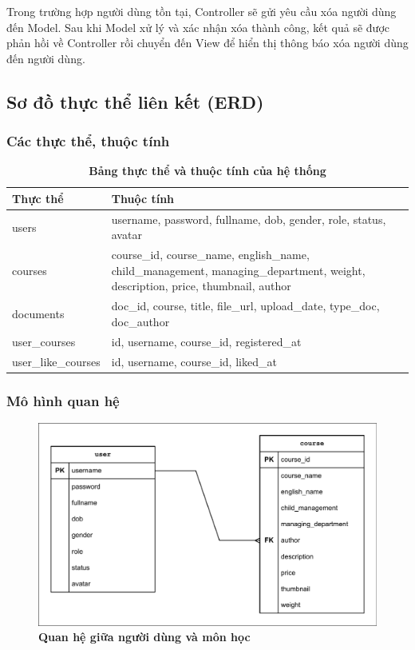 \documentclass{article}
\begin{document}
	 Trong trường hợp người dùng tồn tại, Controller sẽ gửi yêu cầu xóa người dùng đến Model. Sau khi Model xử lý và xác nhận xóa thành công, kết quả sẽ được phản hồi về Controller rồi chuyển đến View để hiển thị thông báo xóa người dùng đến người dùng.
	 
	 \subsection{Sơ đồ thực thể liên kết (ERD)}
	 \subsubsection{Các thực thể, thuộc tính}
	 
	 \begin{table}[H]
	 	\centering
	 	\caption [Bảng thực thể và thuộc tính của hệ thống]{\bfseries \fontsize{12pt}{0pt}\selectfont Bảng thực thể và thuộc tính của hệ thống}
	 	\label{tab311}
	 	\begin{tabular}{|p{6cm}|p{8.5cm}|}
	 		\hline
	 		\textbf{Thực thể} & \textbf{Thuộc tính} \\
	 		\hline
	 		users & username, password, fullname, dob, gender, role, status, avatar \\
	 		\hline
	 		courses & course\_id, course\_name, english\_name, child\_management, managing\_department, weight, description, price, thumbnail, author \\
	 		\hline
	 		documents & doc\_id, course, title, file\_url, upload\_date, type\_doc, doc\_author \\
	 		\hline
	 		user\_courses & id, username, course\_id, registered\_at \\
	 		\hline
	 		user\_like\_courses & id, username, course\_id, liked\_at \\
	 		\hline
	 	\end{tabular}
	 \end{table}
	 
	 \subsubsection{Mô hình quan hệ}
	 \begin{figure}[!ht]
	 	\centering
	 	\includegraphics[trim= 10pt 10pt 10pt 10pt, clip, width=14cm]{edr_fig321_1.pdf}
	 	\caption [Quan hệ giữa người dùng và môn học]{\bfseries \fontsize{12pt}{0pt}\selectfont Quan hệ giữa người dùng và môn học}
	 	\label{fig321}
	 \end{figure}
	 
\end{document}
